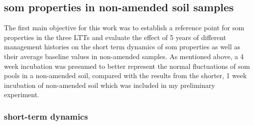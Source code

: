 \documentclass[12pt]{report}
\begin{document}
		\subsection{\gls{som} properties in non-amended soil samples}
		
		The first main objective for this work was to establish a reference point  for \gls{som} properties in the three LTTs and evaluate the effect of 5 years of different management histories on the short term dynamics of \gls{som} properties as well as their average baseline values in non-amended samples. As mentioned above, a 4 week incubation was presumed  to better represent the normal fluctuations of \gls{som} pools in a non-amended soil, compared with the results from the shorter, 1 week incubation of non-amended soil which was  included in my preliminary experiment.
		
		
		\subsubsection{short-term dynamics}
		
\end{document}
